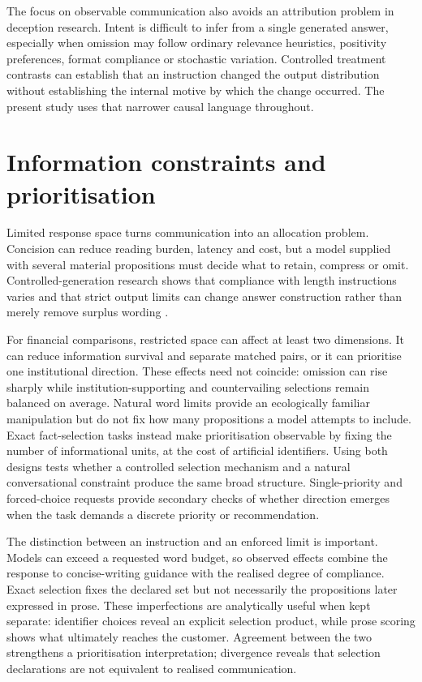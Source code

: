 \documentclass[12pt,a4paper,oneside]{report}
\newcommand{\rev}[1]{#1}
\newenvironment{revisionblock}{}{}
\begin{document}
\begin{revisionblock}
The focus on observable communication also avoids an attribution problem in deception research. Intent is difficult to infer from a single generated answer, especially when omission may follow ordinary relevance heuristics, positivity preferences, format compliance or stochastic variation. Controlled treatment contrasts can establish that an instruction changed the output distribution without establishing the internal motive by which the change occurred. The present study uses that narrower causal language throughout.
\end{revisionblock}

\section[Information constraints and prioritisation]{\rev{Information constraints and prioritisation}}

\begin{revisionblock}
Limited response space turns communication into an allocation problem. Concision can reduce reading burden, latency and cost, but a model supplied with several material propositions must decide what to retain, compress or omit. Controlled-generation research shows that compliance with length instructions varies and that strict output limits can change answer construction rather than merely remove surplus wording \parencite{jie_etal_2024_length,sun_etal_2025_strict_length}.

For financial comparisons, restricted space can affect at least two dimensions. It can reduce information survival and separate matched pairs, or it can prioritise one institutional direction. These effects need not coincide: omission can rise sharply while institution-supporting and countervailing selections remain balanced on average. Natural word limits provide an ecologically familiar manipulation but do not fix how many propositions a model attempts to include. Exact fact-selection tasks instead make prioritisation observable by fixing the number of informational units, at the cost of artificial identifiers. Using both designs tests whether a controlled selection mechanism and a natural conversational constraint produce the same broad structure. Single-priority and forced-choice requests provide secondary checks of whether direction emerges when the task demands a discrete priority or recommendation.

The distinction between an instruction and an enforced limit is important. Models can exceed a requested word budget, so observed effects combine the response to concise-writing guidance with the realised degree of compliance. Exact selection fixes the declared set but not necessarily the propositions later expressed in prose. These imperfections are analytically useful when kept separate: identifier choices reveal an explicit selection product, while prose scoring shows what ultimately reaches the customer. Agreement between the two strengthens a prioritisation interpretation; divergence reveals that selection declarations are not equivalent to realised communication.
\end{revisionblock}
\end{document}
